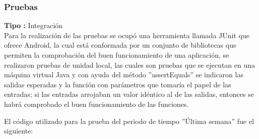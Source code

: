 \subsubsection{Pruebas}
\textbf{Tipo :} Integración \\ \newline
Para la realización de las pruebas se ocupó una herramienta llamada JUnit que ofrece Android, la cual está conformada por un conjunto de bibliotecas que permiten la comprobación del buen funcionamiento de una aplicación, se realizaron pruebas de unidad local, las cuales son pruebas que se ejecutan en una máquina virtual Java y con ayuda del método ''assertEquals'' se indicaron las salidas esperadas y la función con parámetros que tomaría el papel de las entradas; si las entradas arrojaban un valor idéntico al de las salidas, entonces se habrá comprobado el buen funcionamiento de las funciones.  \\ \newline

El código utilizado para la prueba del periodo de tiempo ''Última semana'' fue el siguiente:\\ \newline

